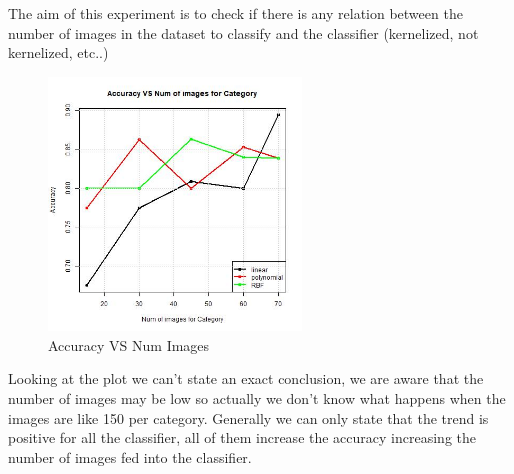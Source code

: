 The aim of this experiment is to check if there is any relation between the number of images in the dataset to classify and the classifier (kernelized, not kernelized, etc..)

\begin{figure}[H]
\centering
\includegraphics[width=0.6\textwidth]{Images/Accuracy_for_categories_bonsai_Motorbikes.jpeg}
\caption{Accuracy VS Num Images}
\end{figure}

Looking at the plot we can't state an exact conclusion, we are aware that the number of images may be low so actually we don't know what happens when the images are like 150 per category. Generally we can only state that the trend is positive for all the classifier, all of them increase the accuracy increasing the number of images fed into the classifier. 